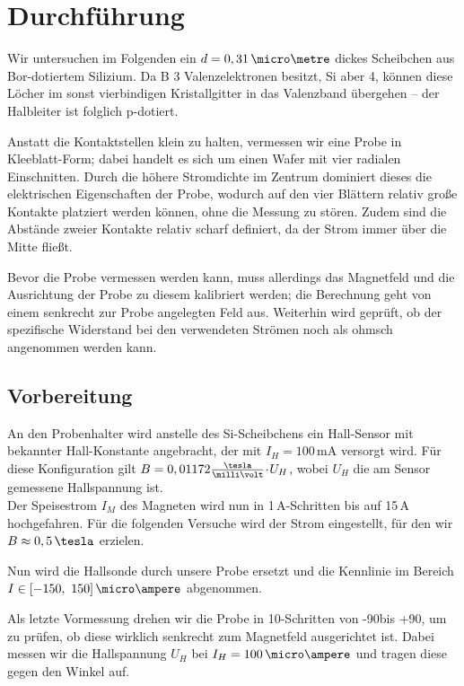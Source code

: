 
\section{Durchführung}
Wir untersuchen im Folgenden ein $d = 0,31\,\micro\metre$ dickes Scheibchen aus Bor-dotiertem Silizium. Da \textsf{B} 3 Valenzelektronen besitzt, \textsf{Si} aber 4, können diese Löcher im sonst vierbindigen Kristallgitter in das Valenzband übergehen -- der Halbleiter ist folglich p-dotiert.

Anstatt die Kontaktstellen klein zu halten, vermessen wir eine Probe in Kleeblatt-Form; dabei handelt es sich um einen Wafer mit vier radialen Einschnitten. Durch die höhere Stromdichte im Zentrum dominiert dieses die elektrischen Eigenschaften der Probe, wodurch auf den vier \glqq Blättern\grqq{} relativ große Kontakte platziert werden können, ohne die Messung zu stören. Zudem sind die Abstände zweier Kontakte relativ scharf definiert, da der Strom immer über die Mitte fließt.

Bevor die Probe vermessen werden kann, muss allerdings das Magnetfeld und die Ausrichtung der Probe zu diesem kalibriert werden; die Berechnung geht von einem senkrecht zur Probe angelegten Feld aus. Weiterhin wird geprüft, ob der spezifische Widerstand bei den verwendeten Strömen noch als ohmsch angenommen werden kann.

\subsection{Vorbereitung}
An den Probenhalter wird anstelle des \textsf{Si}-Scheibchens ein Hall-Sensor mit bekannter Hall-Konstante angebracht, der mit $I_H = 100\,$mA versorgt wird. Für diese Konfiguration gilt $B = 0,01172 \tfrac{\tesla}{\milli\volt} \cdt U_H$, wobei $U_H$ die am Sensor gemessene Hallspannung ist.\\[1ex]
Der Speisestrom $I_M$ des Magneten wird nun in 1\,A-Schritten bis auf 15\,A hochgefahren. Für die folgenden Versuche wird der Strom eingestellt, für den wir $B \approx 0,5 \,\tesla$ erzielen.

Nun wird die Hallsonde durch unsere Probe ersetzt und die Kennlinie im Bereich $I \in [-150,~150]\,\micro\ampere$ abgenommen.

Als letzte Vormessung drehen wir die Probe in 10\degree-Schritten von -90\degree bis +90\degree, um zu prüfen, ob diese wirklich senkrecht zum Magnetfeld ausgerichtet ist. Dabei messen wir die Hallspannung $U_H$ bei $I_H = 100\,\micro\ampere$ und tragen diese gegen den Winkel auf.

